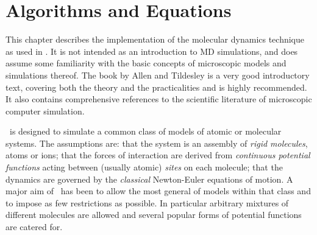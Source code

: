 \chapter{Algorithms and Equations}  %


This chapter  describes the implementation  of the  molecular dynamics
technique as used in \moldy.  It is not intended as an introduction to
MD  simulations, and  does assume some    familiarity  with the  basic
concepts of microscopic models  and simulations thereof.  The book  by
Allen and Tildesley\cite{allen:87}  is a  very good    introductory text,
covering   both the  theory  and  the  practicalities and  is   highly
recommended.  It   also  contains   comprehensive  references  to  the
scientific literature of microscopic computer simulation.

\moldy\  is designed to simulate a common class of models of atomic or
molecular systems. The assumptions are: that the system is an assembly
of  {\em rigid   molecules},  atoms   or  ions;  that  the  forces  of
interaction are derived   from {\em  continuous  potential  functions\/}
acting between (usually atomic) {\em sites\/} on each molecule; that the
dynamics are governed by the {\em classical\/} Newton-Euler equations of
motion.  A major aim of \moldy\ has been to allow the most  general of
models within that class and to impose as few restrictions as possible.
In particular arbitrary mixtures of different molecules are allowed
and several popular forms of potential functions are catered for.


